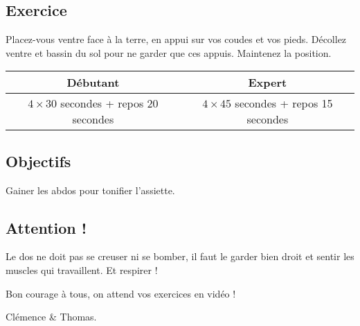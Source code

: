\documentclass[12pt,a4paper]{article}
\subtitle{Fiche \no 4 -- Gainage}
\begin{document}
\maketitle




\subsection*{Exercice}
	Placez-vous ventre face à la terre, en appui sur vos coudes et vos pieds. Décollez ventre et bassin du sol pour ne garder que ces appuis. Maintenez la position.

	\begin{center}
		\begin{tabular}{c|c}
			\textbf{Débutant} & \textbf{Expert} \\
			\hline
			$4\times 30$ secondes + repos 20 secondes & $4\times45$ secondes + repos 15 secondes \\
		\end{tabular}
	\end{center}

\subsection*{Objectifs}
	Gainer les abdos pour tonifier l'assiette.

\subsection*{Attention !}
	Le dos ne doit pas se creuser ni se bomber, il faut le garder bien droit et sentir les muscles qui travaillent. Et respirer !

\vfill
\begin{flushright}
	Bon courage à tous, on attend vos exercices en vidéo ! \phantom{Clémence et Thomas}

	Clémence \& Thomas.
\end{flushright}
\end{document}
